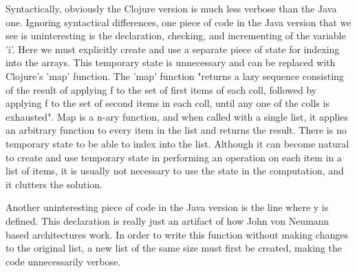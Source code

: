 Syntactically, obviously the Clojure version is much less verbose than the Java one.
Ignoring syntactical differences, one piece of code in the Java version that we see is uninteresting is the declaration,
checking, and incrementing of the variable 'i'. Here we must explicitly create and use a separate piece of state for indexing into the arrays. This temporary state is unnecessary
and can be replaced with Clojure's 'map' function. The 'map' function "returns a lazy sequence consisting of the result of applying f to the
set of first items of each coll, followed by applying f to the set
of second items in each coll, until any one of the colls is
exhausted". Map is a n-ary function, and when called with a single list, it applies an arbitrary function to every item in the list and returns the result. There is no 
temporary state to be able to index into the list. Although it can become natural to create and use temporary state in performing an operation on each item in a list of items,
it is usually not necessary to use the state in the computation, and it clutters the solution. 

Another uninteresting piece of code in the Java version is the line where y is defined. 
This declaration is really just an artifact of how John von Neumann based architectures work. In order to write this function without making changes to 
the original list, a new list of the same size must first be created, making the code unnecessarily verbose.



